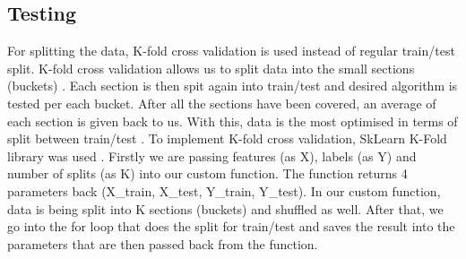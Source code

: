 \subsection{Testing}
For splitting the data, K-fold cross validation is used instead of regular train/test split. K-fold cross validation allows us to split data into the small sections (buckets) \parencite{web:IntroductionToCrossValidation}. Each section is then spit again into train/test and desired algorithm is tested per each bucket. After all the sections have been covered, an average of each section is given back to us. With this, data is the most optimised in terms of split between train/test \parencite{refaeilzadeh2009cross}.
\newline
To implement K-fold cross validation, SkLearn K-Fold library was used \parencite{web:ModelSelectionKFold}. Firstly we are passing features (as X), labels (as Y) and number of splits (as K) into our custom function. The function returns 4 parameters back (X{\_}train, X{\_}test, Y{\_}train, Y{\_}test).
\newline
In our custom function, data is being split into K sections (buckets) and shuffled as well. After that, we go into the for loop that does the split for train/test and saves the result into the parameters that are then passed back from the function. 
